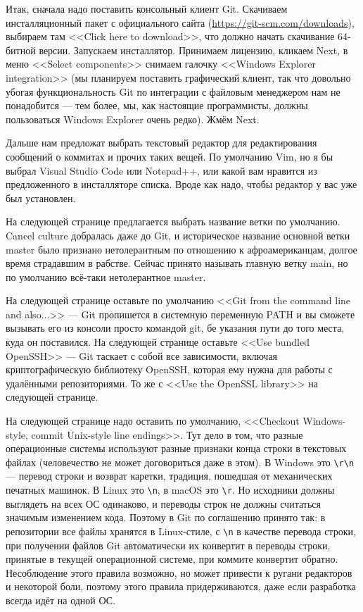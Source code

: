 \documentclass{../text-style}
\begin{document}
Итак, сначала надо поставить консольный клиент Git. Скачиваем инсталляционный пакет с официального сайта (\url{https://git-scm.com/downloads}), выбираем там <<Click here to download>>, что должно начать скачивание 64-битной версии. Запускаем инсталлятор. Принимаем лицензию, кликаем Next, в меню <<Select components>> снимаем галочку <<Windows Explorer integration>> (мы планируем поставить графический клиент, так что довольно убогая функциональность Git по интеграции с файловым менеджером нам не понадобится --- тем более, мы, как настоящие программисты, должны пользоваться Windows Explorer очень редко). Жмём Next.

Дальше нам предложат выбрать текстовый редактор для редактирования сообщений о коммитах и прочих таких вещей. По умолчанию Vim, но я бы выбрал Visual Studio Code или Notepad++, или какой вам нравится из предложенного в инсталляторе списка. Вроде как надо, чтобы редактор у вас уже был установлен.

На следующей странице предлагается выбрать название ветки по умолчанию. Cancel culture добралась даже до Git, и историческое название основной ветки master было признано нетолерантным по отношению к афроамериканцам, долгое время страдавшим в рабстве. Сейчас принято называть главную ветку main, но по умолчанию всё-таки нетолерантное master.

На следующей странице оставьте по умолчанию <<Git from the command line and also...>> --- Git пропишется в системную переменную PATH и вы сможете вызывать его из консоли просто командой git, бе указания пути до того места, куда он поставился. На следующей странице оставьте <<Use bundled OpenSSH>> --- Git таскает с собой все зависимости, включая криптографическую библиотеку OpenSSH, которая ему нужна для работы с удалёнными репозиториями. То же с <<Use the OpenSSL library>> на следующей странице.

На следующей странице надо оставить по умолчанию, <<Checkout Windows-style, commit Unix-style line endings>>. Тут дело в том, что разные операционные системы используют разные признаки конца строки в текстовых файлах (человечество не может договориться даже в этом). В Windows это \verb|\r\n| --- перевод строки и возврат каретки, традиция, пошедшая от механических печатных машинок. В Linux это \verb|\n|, в macOS это \verb|\r|. Но исходники должны выглядеть на всех ОС одинаково, и переводы строк не должны считаться значимым изменением кода. Поэтому в Git по соглашению принято так: в репозитории все файлы хранятся в Linux-стиле, с \verb|\n| в качестве перевода строки, при получении файлов Git автоматически их конвертит в переводы строки, принятые в текущей операционной системе, при коммите конвертит обратно. Несоблюдение этого правила возможно, но может привести к ругани редакторов и некоторой боли, поэтому этого правила придерживаются, даже если разработка всегда идёт на одной ОС.
\end{document}
